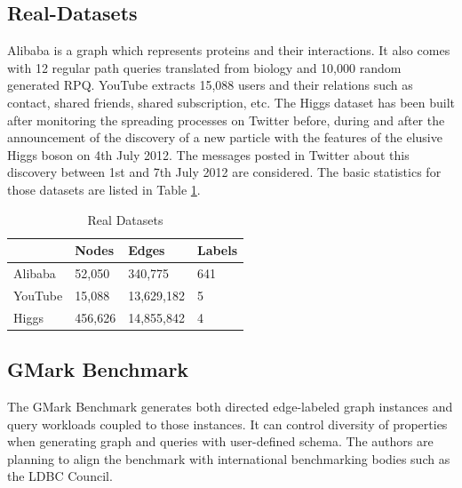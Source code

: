 \subsection{Real-Datasets}
Alibaba is a graph which represents proteins and their interactions. It also comes with 12 regular path queries translated from biology and 10,000 random generated RPQ. YouTube extracts 15,088 users and their relations such as contact, shared friends, shared subscription, etc. The Higgs dataset has been built after monitoring the spreading processes on Twitter before, during and after the announcement of the discovery of a new particle with the features of the elusive Higgs boson on 4th July 2012. The messages posted in Twitter about this discovery between 1st and 7th July 2012 are considered. The basic statistics for those datasets are listed in Table \ref{real-datasets}.
\begin{table}[h!]
\def\arraystretch{2}
\centering
\caption{Real Datasets}
\label{real-datasets}
\begin{tabular}{|l|l|l|l|}
\hline
        & Nodes   & Edges      & Labels \\
\hline
Alibaba & 52,050  & 340,775    & 641    \\
\hline
YouTube & 15,088  & 13,629,182 & 5      \\
\hline
Higgs   & 456,626 & 14,855,842 & 4     \\
\hline
\end{tabular}
\end{table}
\subsection{GMark Benchmark}
The GMark Benchmark\cite{bagan2015controlling} generates both directed edge-labeled graph instances and query workloads coupled to those instances. It can control diversity of properties when generating graph and queries with user-defined schema. The authors are planning to align the benchmark with international benchmarking bodies such as the LDBC Council\cite{ldbc}.

